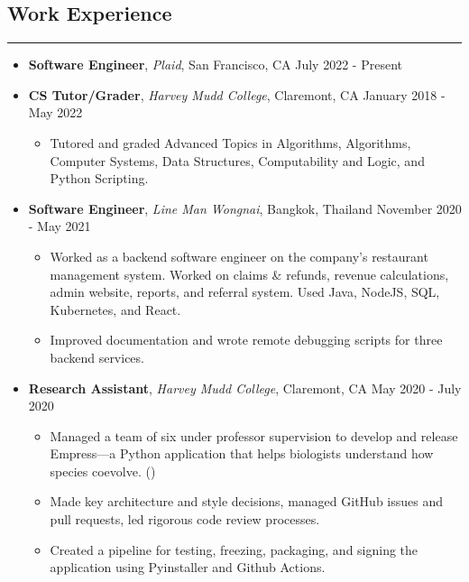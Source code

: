 \documentclass[10pt,letterpaper]{article}
\begin{document}
\subsection*{Work Experience}
\vspace{-0.5em}
\hrule
\vspace{1em}
  \begin{itemize}[label={},leftmargin=*]
    \setlength\itemsep{1em}
    \parskip=-0.2em
    \item
    {\textbf{Software Engineer}, \textit{Plaid}, San Francisco, CA \hfill {July 2022 - Present}}
    \item
    {\textbf{CS Tutor/Grader}, \textit{Harvey Mudd College}, Claremont, CA \hfill {January 2018 - May 2022}}
    \begin{itemize}[label=\textbullet]
      \itemsep0em
      \item Tutored and graded Advanced Topics in Algorithms, Algorithms, Computer Systems, Data Structures, Computability and Logic, and Python Scripting.
    \end{itemize}
    \item
    {\textbf{Software Engineer}, \textit{Line Man Wongnai}, Bangkok, Thailand \hfill {November 2020 - May 2021}}
    \begin{itemize}[label=\textbullet]
      \itemsep0em
      \item Worked as a backend software engineer on the company's restaurant management system. Worked on claims \& refunds, revenue calculations, admin website, reports, and referral system. Used Java, NodeJS, SQL, Kubernetes, and React.
      \item Improved documentation and wrote remote debugging scripts for three backend services.
    \end{itemize}
    \item
    {\textbf{Research Assistant}, \textit{Harvey Mudd College}, Claremont, CA \hfill {May 2020 - July 2020}}
    \begin{itemize}[label=\textbullet]
      \itemsep0em
      \item Managed a team of six under professor supervision to develop and release Empress---a Python application that helps biologists understand how species coevolve. (\href{https://github.com/ssantichaivekin/empress}
      {})
      \item Made key architecture and style decisions, managed GitHub issues and pull requests, led rigorous code review processes.
      \item Created a pipeline for testing, freezing, packaging, and signing the application using Pyinstaller and Github Actions.

\end{itemize}
\end{itemize}
\end{document}
